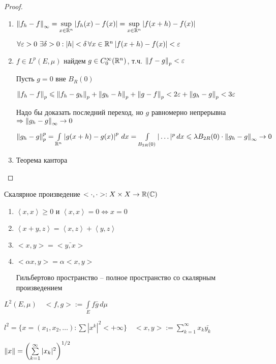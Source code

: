 \begin{proof}\thmslashn
	
	\begin{enumerate}
	\item 
	$\left\|f_h - f\right\|_\infty  = \sup\limits_{x \in \mathbb{R}^n} \left|f_h(x) - f(x)\right| = \sup\limits_{x \in \mathbb{R}^n} \left|f(x+ h) - f(x)\right|$
	
	$\forall \varepsilon > 0\,\, \exists \delta > 0: |h| < \delta\,\forall x \in \mathbb{R}^n\, |f(x+h) - f(x)| < \varepsilon$
	
	\item
	$f\in L^p(E, \mu)$ найдем $g \in C_0^\infty(\mathbb{R}^n)$, т.ч. $\left\|f - g\right\|_p < \varepsilon$
	
	Пусть $g = 0$ вне $B_R(0)$
	
	$\left\|f_h - f\right\|_p \leqslant \left\|f_h - g_h\right\|_p + \left\|g_h - h\right\|_p + \left\|g - f\right\|_p < 2\varepsilon + \left\|g_h - g\right\|_p < 3\varepsilon$ 
	
	Надо бы доказать последний переход, но $g$ равномерно непрерывна $\Rightarrow \left\|g_h - g\right\|_{\infty} \to 0$
	
	$\left\|g_h - g\right\|^p_p = \int\limits_{\mathbb{R}^n}\left|g(x + h) - g(x)\right|^p\,dx = \int\limits_{B_{2R}(0)}|\ldots|^p\,dx \leqslant \lambda B_{2R}(0) \cdot \left\|g_h - g\right\|_\infty \to 0$
	
	
	\item
	Теорема кантора
	
	\end{enumerate}
	
\end{proof}

\begin{definition}\thmslashn
	
	Скалярное произведение $<\cdot, \cdot>: X\times X \to \mathbb{R}(\mathbb{C})$
	
	\begin{enumerate}
		\item 
		$\left\langle  x, x\right\rangle \geqslant 0$ и $\left\langle x, x\right\rangle = 0 \Leftrightarrow x = 0$
		
		\item 
		$\left\langle  x + y, z\right\rangle = \left\langle x, z\right\rangle + \left\langle y, z\right\rangle$
		
		\item
		$<x, y> = \bar{<y, x>}$
		
		\item
		$<\alpha x, y> = \alpha<x, y>$
		
		Гильбертово пространство -- полное пространство со скалярным произведением
		
	\end{enumerate}
	
\end{definition}

\begin{example}\thmslashn
	
	$L^2(E, \mu) \quad <f, g> := \int\limits_{E} f\bar{g}\,d\mu$
	
	$l^2 = \{x = (x_1, x_2, \ldots): \sum |x^k|^2 < +\infty\} \quad <x, y> := \sum_{k = 1}^{\infty} x_k\bar{y_k}$
	
	$\left\|x\right\| = \left( \sum\limits_{k = 1}^\infty |x_k|^2 \right)^{1/2}$
	
\end{example}